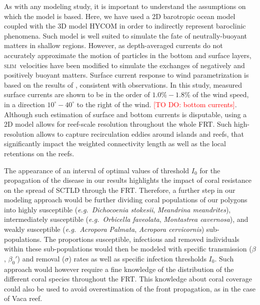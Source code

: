 \documentclass[utf8]{frontiersSCNS}
\newcommand{\slim}{\textsc{slim}\ }
\newcommand{\eg}{{\it e.g.}\ }
\begin{document}
As with any modeling study, it is important to understand the assumptions on which the model is based. Here, we have used a 2D barotropic ocean model coupled with the 3D model HYCOM \citep{Chassignet2007} in order to indirectly represent baroclinic phenomena. Such model is well suited to simulate the fate of neutrally-buoyant matters in shallow regions. However, as depth-averaged currents do not accurately approximate the motion of particles in the bottom and surface layers, \slim velocities have been modified to simulate the exchanges of negatively and positively buoyant matters. Surface current response to wind parametrization is based on the results of \cite{ardhuin2009observation}, consistent with observations. In this study, measured surface currents are shown to be in the order of $1.0\% - 1.8\%$ of the wind speed, in a direction $10^\circ - 40^\circ$ to the right of the wind. \textcolor{red}{[TO DO: bottom currents]}. Although such estimation of surface and bottom currents is disputable, using a 2D model allows for reef-scale resolution throughout the whole FRT. Such high-resolution allows to capture recirculation eddies around islands and reefs, that significantly impact the weighted connectivity length as well as the local retentions on the reefs.

The appearance of an interval of optimal values of threshold $I_0$ for the propagation of the disease in our results highlights the impact of coral resistance on the spread of SCTLD through the FRT. Therefore, a further step in our modeling approach would be further dividing coral populations of our polygons into highly susceptible (\eg \textit{Dichocoenia stokesii}, \textit{Meandrina meandrites}), intermediately susceptible (\eg \textit{Orbicella faveolata}, \textit{Montastrea cavernosa}), and weakly susceptible (\eg \textit{Acropora Palmata}, \textit{Acropora cervicornis}) sub-populations. The proportions susceptible, infectious and removed individuals within these sub-populations would then be modeled with specific transmission ($\beta$, $\beta_0'$) and removal ($\sigma$) rates as well as specific infection thresholds $I_0$. Such approach would however require a fine knowledge of the distribution of the different coral species throughout the FRT. This knowledge about coral coverage could also be used to avoid overestimation of the front propagation, as in the case of Vaca reef.
\end{document}
